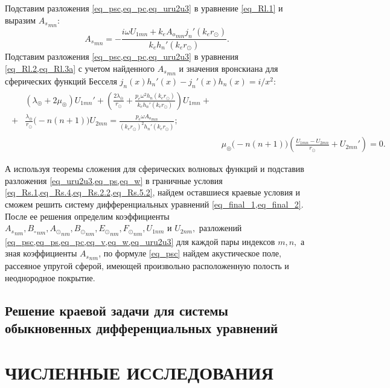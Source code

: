 Подставим разложения \cref{eq_psc,eq_pc,eq_uru2u3} в уравнение \cref{eq_Rl.1} и выразим ${A_s}_{mn}:$
\begin{equation}\label{eq_Psc_U1}
{A_s}_{mn} = -\frac{i\omega U_{1mn}+k_e {A_o}_{mn}j_n'(k_e r_\odot)}{k_e h_n'(k_e r_\odot)}.
\end{equation}
Подставим разложения \cref{eq_psc,eq_pc,eq_uru2u3} в уравнения \cref{eq_Rl.2,eq_Rl.3a} с учетом найденного ${A_s}_{mn}$ и значения вронскиана для сферических функций Бесселя $j_n(x)h_n'(x)-j_n'(x)h_n(x)=i/x^2:$
\begin{align}
\begin{split}
&(\lambda_\circledcirc+2\mu_\circledcirc)U_{1mn}' + \left(\frac{2\lambda_\circledcirc}{r_\odot} + \frac{p_e\omega^2 h_n(k_e r_\odot)}{k_e h_n'(k_e r_\odot)}\right)U_{1mn} + \\
+& \frac{\lambda_\circledcirc}{r_\odot}\bigl(-n(n+1)\bigr)U_{2mn} 
= \frac{p_e\omega {A_o}_{mn}}{(k_e r_\odot)^2 h_n'(k_e r_\odot)};
\end{split}\\
&\mu_\circledcirc\bigl(-n(n+1)\bigr)\left(\frac{U_{1mn}-U_{2mn}}{r_\odot} + U_{2mn}'\right) = 0.
\end{align}


А используя теоремы сложения для сферических волновых функций и подставив разложения \cref{eq_uru2u3,eq_ps,eq_w} в граничные условия \cref{eq_Rs.1,eq_Rs.4,eq_Rs.2.2,eq_Rs.5.2}, найдем оставшиеся краевые условия и сможем решить  систему дифференциальных уравнений \cref{eq_final_1,eq_final_2}. После ее решения определим коэффициенты \\
${A_s}_{nm}, {B_\circ}_{nm}, {A_\odot}_{nm}, {B_\odot}_{nm}, {E_\odot}_{nm}, {F_\odot}_{nm}, {U}_{1nm}$ и ${U}_{2nm},$ разложений  \cref{eq_psc,eq_ps,eq_pc,eq_v,eq_w,eq_uru2u3} для каждой пары индексов $m,n,$ а зная коэффициенты ${A_s}_{nm}$, по формуле \cref{eq_psc} найдем акустическое поле, рассеяное упругой сферой, имеющей произвольно расположенную полость и неоднородное покрытие.

\newpage
\subsection{Решение краевой задачи для системы обыкновенных дифференциальных уравнений}

\newpage
\section{ЧИСЛЕННЫЕ ИССЛЕДОВАНИЯ}

